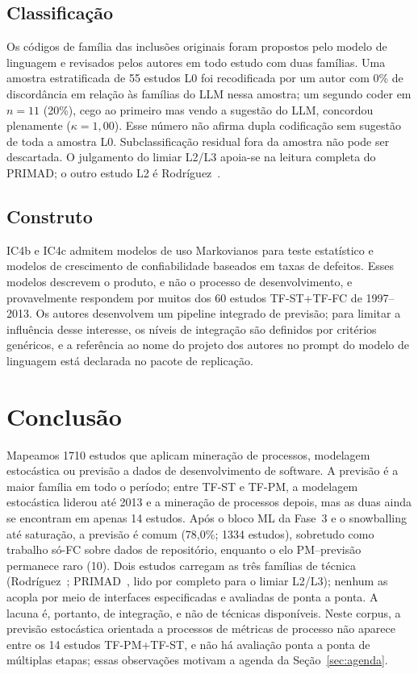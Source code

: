 \documentclass[preprint,12pt,authoryear=false]{elsarticle}
\newcommand{\PM}{TF-PM}
\newcommand{\ST}{TF-ST}
\newcommand{\FC}{TF-FC}
\begin{document}
\subsection{Classificação}

Os códigos de família das inclusões originais foram propostos pelo modelo de linguagem e revisados pelos autores em todo estudo com duas famílias. Uma amostra estratificada de 55 estudos L0 foi recodificada por um autor com 0\% de discordância em relação às famílias do LLM nessa amostra; um segundo coder em $n = 11$ (20\%), cego ao primeiro mas vendo a sugestão do LLM, concordou plenamente ($\kappa = 1{,}00$). Esse número não afirma dupla codificação sem sugestão de toda a amostra L0. Subclassificação residual fora da amostra não pode ser descartada. O julgamento do limiar L2/L3 apoia-se na leitura completa do PRIMAD; o outro estudo L2 é Rodr{\'i}guez~\cite{rodriguez2017}.

\subsection{Construto}

IC4b e IC4c admitem modelos de uso Markovianos para teste estatístico e modelos de crescimento de confiabilidade baseados em taxas de defeitos. Esses modelos descrevem o produto, e não o processo de desenvolvimento, e provavelmente respondem por muitos dos 60 estudos \ST{}+\FC{} de 1997--2013. Os autores desenvolvem um pipeline integrado de previsão; para limitar a influência desse interesse, os níveis de integração são definidos por critérios genéricos, e a referência ao nome do projeto dos autores no prompt do modelo de linguagem está declarada no pacote de replicação.

\section{Conclusão}\label{sec:conclusion}

Mapeamos 1710 estudos que aplicam mineração de processos, modelagem estocástica ou previsão a dados de desenvolvimento de software. A previsão é a maior família em todo o período; entre \ST{} e \PM{}, a modelagem estocástica liderou até 2013 e a mineração de processos depois, mas as duas ainda se encontram em apenas 14 estudos. Após o bloco ML da Fase~3 e o snowballing até saturação, a previsão é comum (78,0\%; 1334 estudos), sobretudo como trabalho só-FC sobre dados de repositório, enquanto o elo PM--previsão permanece raro (10). Dois estudos carregam as três famílias de técnica (Rodr{\'i}guez~\cite{rodriguez2017}; PRIMAD~\cite{guinea2025}, lido por completo para o limiar L2/L3); nenhum as acopla por meio de interfaces especificadas e avaliadas de ponta a ponta. A lacuna é, portanto, de integração, e não de técnicas disponíveis. Neste corpus, a previsão estocástica orientada a processos de métricas de processo não aparece entre os 14 estudos \PM{}+\ST{}, e não há avaliação ponta a ponta de múltiplas etapas; essas observações motivam a agenda da Seção~\ref{sec:agenda}.
\end{document}
